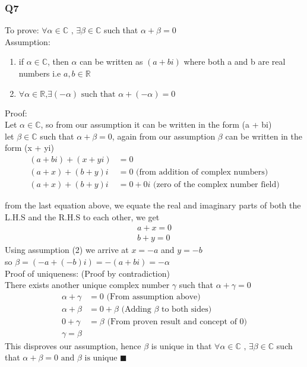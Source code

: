\documentclass{article}
\begin{document}
\subsubsection*{Q7}
To prove: $\forall \alpha \in \mathbb{C} \textrm{ , } \exists \beta \in \mathbb{C}$ such that $\alpha + \beta = 0$ \\
Assumption:
\begin{enumerate}
    \item if $\alpha \in \mathbb{C}$, then $\alpha$ can be written as $(a + bi)$ where both a and b are real numbers i.e $a,b\in \mathbb{R}$
    \item $\forall \alpha \in \mathbb{R} \textrm{,} \exists (-\alpha) \textrm{ such that } \alpha + (-\alpha) = 0$ 
\end{enumerate}
Proof:\\
Let $\alpha \in \mathbb{C}$, so from our assumption it can be written in the form (a + bi) \\
let $\beta \in \mathbb{C}$ such that $\alpha + \beta = 0$, again from our assumption $\beta$ can be written in the form (x + yi) \\
\begin{equation*}
\begin{split}
    (a + bi) + (x + yi) &= 0 \\
    (a+x) + (b + y)i &= 0 \textrm{ (from addition of complex numbers)} \\
    (a + x) + (b + y)i &= 0 + 0i \textrm{ (zero of the complex number field)}
\end{split}
\end{equation*}

from the last equation above, we equate the real and imaginary parts of both the L.H.S and the R.H.S to each other, we get \\
\begin{gather*}
    a + x = 0 \\
    b + y = 0
\end{gather*}
Using assumption (2) we arrive at $x = -a$ and $y = -b$ \\
so $\beta = (-a + (-b)i) = -(a+bi) = -\alpha$ \\

Proof of uniqueness: (Proof by contradiction) \\
There exists another unique complex number $\gamma $ such that $\alpha + \gamma = 0$
\begin{align*}
    \alpha + \gamma &= 0 \textrm{ (From assumption above)} \\
    \alpha + \beta &= 0 + \beta \textrm{ (Adding $\beta$ to both sides)} \\
    0 + \gamma &= \beta \textrm{ (From proven result and concept of 0)} \\
    \gamma = \beta
\end{align*}
This disproves our assumption, hence $\beta$ is unique in that $\forall \alpha \in \mathbb{C} \textrm{ , } \exists \beta \in \mathbb{C}$ such that $\alpha + \beta = 0 \textrm{ and $\beta$ is unique}$ 
$\blacksquare$
\end{document}
